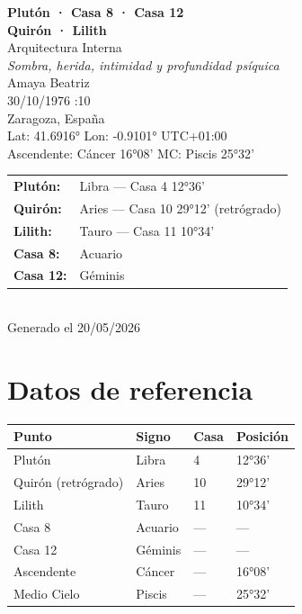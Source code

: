\documentclass[11pt,a4paper]{article}
\begin{document}
\begin{titlepage}
  \centering
  \vspace*{1.5cm}
  {\Huge\bfseries\color{azulai} Plutón · Casa 8 · Casa 12}\\[0.35cm]
  {\Huge\bfseries\color{azulai} Quirón · Lilith}\\[0.5cm]
  {\large\color{grisai} Arquitectura Interna}\\[0.3cm]
  {\small\itshape\color{grisai} Sombra, herida, intimidad y profundidad psíquica}\\[2cm]
  {\huge\color{doradoai} Amaya Beatriz}\\[1.5cm]
  {\Large 30/10/1976 :10}\\[0.3cm]
  {\Large Zaragoza, España}\\[0.3cm]
  {\normalsize Lat: 41.6916° \quad Lon: -0.9101° \quad UTC+01:00}\\[0.3cm]
  {\normalsize Ascendente: Cáncer 16°08' \quad
    MC: Piscis 25°32'}\\[2cm]

  \begin{tabular}{ll}
    \textbf{Plutón:}  & Libra — Casa 4 12°36' \\
    \textbf{Quirón:}  & Aries — Casa 10 29°12' (retrógrado) \\
    \textbf{Lilith:}  & Tauro — Casa 11 10°34' \\
    \textbf{Casa 8:}  & Acuario \\
    \textbf{Casa 12:} & Géminis \\
  \end{tabular}\\[2cm]

  \vfill
  {\small Generado el 20/05/2026}
\end{titlepage}

\tableofcontents
\newpage

\section{Datos de referencia}

\begin{center}
\begin{tabular}{llll}
  \toprule
  \textbf{Punto} & \textbf{Signo} & \textbf{Casa} & \textbf{Posición} \\
  \midrule
  Plutón & Libra & 4 & 12°36' \\
  Quirón (retrógrado) & Aries & 10 & 29°12' \\
  Lilith          & Tauro & 11 & 10°34' \\
  Casa 8          & Acuario             & ---                  & --- \\
  Casa 12         & Géminis            & ---                  & --- \\
  Ascendente      & Cáncer         & ---                  & 16°08' \\
  Medio Cielo     & Piscis          & ---                  & 25°32' \\
  \bottomrule
\end{tabular}
\end{center}
\end{document}
